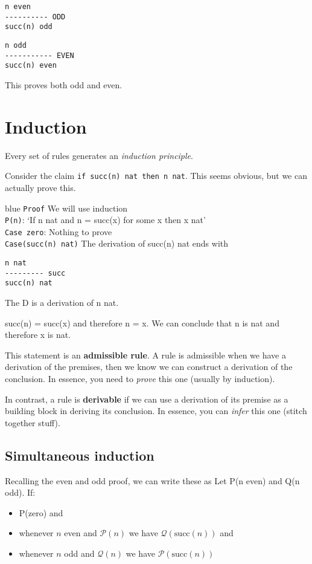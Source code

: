 \documentclass[11pt,a4paper,titlepage,dvipsnames,cmyk]{scrartcl}
\begin{document}
\begin{lstlisting}
n even
---------- ODD
succ(n) odd
\end{lstlisting}

\begin{lstlisting}
n odd
----------- EVEN
succ(n) even
\end{lstlisting}

This proves both odd and even.

\section{Induction}
Every set of rules generates an \textit{induction principle}. 

Consider the claim \lstinline|if succ(n) nat then n nat|. This seems obvious, but we can actually prove this.

\begin{blue}{blue}
\texttt{Proof} We will use induction \\
\texttt{P(n)}: `If n nat and n = succ(x) for some x then x nat' \\
\texttt{Case zero}: Nothing to prove \\
\texttt{Case(succ(n) nat)} The derivation of succ(n) nat ends with
\begin{lstlisting}
n nat
--------- succ
succ(n) nat
\end{lstlisting}
The D is a derivation of n nat.

succ(n) = succ(x) and therefore n = x. We can conclude that n is nat and therefore x is nat.
\end{blue}

This statement is an \textbf{admissible rule}. A rule is admissible when we have a derivation of the premises, then we know we can construct a derivation of the conclusion. In essence, you need to \textit{prove} this one (usually by induction).

In contrast, a rule is \textbf{derivable} if we can use a derivation of its premise as a building block in deriving its conclusion. In essence, you can \textit{infer} this one (stitch together stuff).

\subsection{Simultaneous induction}
Recalling the even and odd proof, we can write these as Let P(n even) and Q(n odd). If:
\begin{itemize}
    \item P(zero) and
    \item whenever $n$ even and $\mathcal{P}(n)$ we have $\mathcal{Q}(\text{succ}(n))$ and
    \item whenever $n$ odd and $\mathcal{Q}(n)$ we have $\mathcal{P}(\text{succ}(n))$
\end{itemize}
\end{document}
